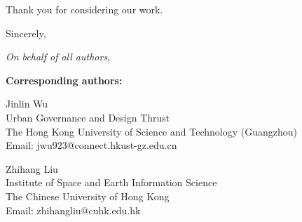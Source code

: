 \documentclass[11pt]{article}
\begin{document}
Thank you for considering our work.

Sincerely,

\textit{On behalf of all authors,}

\vspace{0.5em}

\textbf{Corresponding authors:}

Jinlin Wu\\
Urban Governance and Design Thrust\\
The Hong Kong University of Science and Technology (Guangzhou)\\
Email: jwu923@connect.hkust-gz.edu.cn

Zhihang Liu\\
Institute of Space and Earth Information Science\\
The Chinese University of Hong Kong\\
Email: zhihangliu@cuhk.edu.hk
\end{document}
